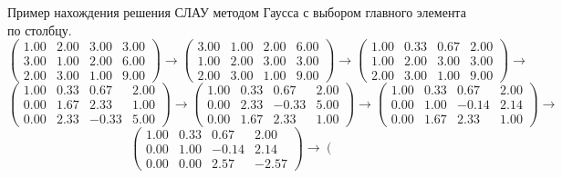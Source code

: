 \begin{example}
  Пример нахождения решения СЛАУ методом Гаусса с выбором главного элемента
  по столбцу.
  \[
    \left(\begin{array}{ccc|c}
        1.00 & 2.00 & 3.00 & 3.00 \\
        3.00 & 1.00 & 2.00 & 6.00 \\
        2.00 & 3.00 & 1.00 & 9.00
      \end{array}\right)\rightarrow
    \left(\begin{array}{ccc|c}
        3.00 & 1.00 & 2.00 & 6.00 \\
        1.00 & 2.00 & 3.00 & 3.00 \\
        2.00 & 3.00 & 1.00 & 9.00
      \end{array}\right)\rightarrow
    \left(\begin{array}{ccc|c}
        1.00 & 0.33 & 0.67 & 2.00 \\
        1.00 & 2.00 & 3.00 & 3.00 \\
        2.00 & 3.00 & 1.00 & 9.00
      \end{array}\right)\rightarrow
  \]
  \[
    \left(\begin{array}{ccc|c}
        1.00 & 0.33 & 0.67  & 2.00 \\
        0.00 & 1.67 & 2.33  & 1.00 \\
        0.00 & 2.33 & -0.33 & 5.00
      \end{array}\right)\rightarrow
    \left(\begin{array}{ccc|c}
        1.00 & 0.33 & 0.67  & 2.00 \\
        0.00 & 2.33 & -0.33 & 5.00 \\
        0.00 & 1.67 & 2.33  & 1.00
      \end{array}\right)\rightarrow
    \left(\begin{array}{ccc|c}
        1.00 & 0.33 & 0.67  & 2.00 \\
        0.00 & 1.00 & -0.14 & 2.14 \\
        0.00 & 1.67 & 2.33  & 1.00
      \end{array}\right)\rightarrow
  \]
  \[
    \left(\begin{array}{ccc|c}
        1.00 & 0.33 & 0.67  & 2.00  \\
        0.00 & 1.00 & -0.14 & 2.14  \\
        0.00 & 0.00 & 2.57  & -2.57
      \end{array}\right)\rightarrow
    \left(\begin{array}{ccc|c}

\end{array}\]
\end{example}
